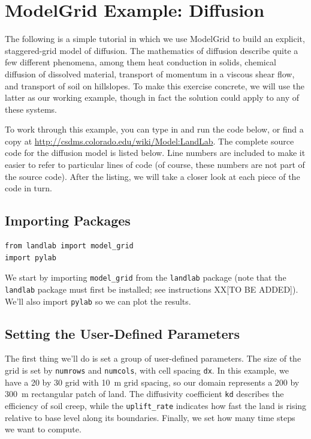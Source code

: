 \documentclass[12pt]{article}
\newcommand{\code}[1]{{\tt #1}}
\begin{document}
\section{ModelGrid Example: Diffusion} 

The following is a simple tutorial in which we use ModelGrid to build an explicit, staggered-grid model of diffusion. The mathematics of diffusion describe quite a few different phenomena, among them heat conduction in solids, chemical diffusion of dissolved material, transport of momentum in a viscous shear flow, and transport of soil on hillslopes. To make this exercise concrete, we will use the latter as our working example, though in fact the solution could apply to any of these systems.

To work through this example, you can type in and run the code below, or find a copy at \url{http://csdms.colorado.edu/wiki/Model:LandLab}. The complete source code for the diffusion model is listed below. Line numbers are included to make it easier to refer to particular lines of code (of course, these numbers are not part of the source code). After the listing, we will take a closer look at each piece of the code in turn.




\newpage
\subsection{Importing Packages}

\begin{lstlisting}[firstnumber=11]
from landlab import model_grid
import pylab
\end{lstlisting}

We start by importing {\tt model\_grid} from the {\tt landlab} package (note that the {\tt landlab} package must first be installed; see instructions XX[TO BE ADDED]). We'll also import {\tt pylab} so we can plot the results.


\subsection{Setting the User-Defined Parameters}



The first thing we'll do is set a group of user-defined parameters. The size of the grid is set by \code{numrows} and \code{numcols}, with cell spacing \code{dx}. In this example, we have a 20 by 30 grid with 10~m grid spacing, so our domain represents a 200 by 300~m rectangular patch of land. The diffusivity coefficient \code{kd} describes the efficiency of soil creep, while the \code{uplift\_rate} indicates how fast the land is rising relative to base level along its boundaries. Finally, we set how many time steps we want to compute.
\end{document}

